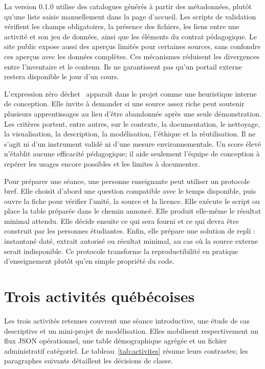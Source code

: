 La version 0.1.0 utilise des catalogues générés à partir des métadonnées, plutôt qu'une liste saisie manuellement dans la page d'accueil. Les scripts de validation vérifient les champs obligatoires, la présence des fichiers, les liens entre une activité et son jeu de données, ainsi que les éléments du contrat pédagogique. Le site public expose aussi des aperçus limités pour certaines sources, sans confondre ces aperçus avec les données complètes. Ces mécanismes réduisent les divergences entre l'inventaire et le contenu. Ils ne garantissent pas qu'un portail externe restera disponible le jour d'un cours.

L'expression \og zéro déchet \fg~apparaît dans le projet comme une heuristique interne de conception. Elle invite à demander si une source assez riche peut soutenir plusieurs apprentissages au lieu d'être abandonnée après une seule démonstration. Les critères portent, entre autres, sur le contexte, la documentation, le nettoyage, la visualisation, la description, la modélisation, l'éthique et la réutilisation. Il ne s'agit ni d'un instrument validé ni d'une mesure environnementale. Un score élevé n'établit aucune efficacité pédagogique; il aide seulement l'équipe de conception à repérer les usages encore possibles et les limites à documenter.

Pour préparer une séance, une personne enseignante peut utiliser un protocole bref. Elle choisit d'abord une question compatible avec le temps disponible, puis ouvre la fiche pour vérifier l'unité, la source et la licence. Elle exécute le script ou place la table préparée dans le chemin annoncé. Elle produit elle-même le résultat minimal attendu. Elle décide ensuite ce qui sera fourni et ce qui devra être construit par les personnes étudiantes. Enfin, elle prépare une solution de repli : instantané daté, extrait autorisé ou résultat minimal, au cas où la source externe serait indisponible. Ce protocole transforme la reproductibilité en pratique d'enseignement plutôt qu'en simple propriété du code.

\section{Trois activités québécoises}

Les trois activités retenues couvrent une séance introductive, une étude de cas descriptive et un mini-projet de modélisation. Elles mobilisent respectivement un flux JSON opérationnel, une table démographique agrégée et un fichier administratif catégoriel. Le tableau~\ref{tab:activites} résume leurs contrastes; les paragraphes suivants détaillent les décisions de classe.

